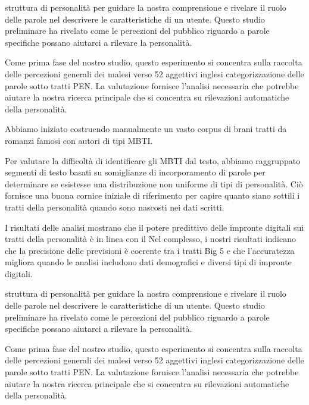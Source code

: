 struttura di personalità per guidare la nostra comprensione e rivelare il ruolo delle parole nel descrivere le caratteristiche di un utente. 
Questo studio preliminare ha rivelato come le percezioni del pubblico riguardo a parole specifiche possano aiutarci a rilevare la personalità. 

Come prima fase del nostro studio, questo esperimento si concentra sulla raccolta delle percezioni generali dei malesi verso 52 aggettivi inglesi categorizzazione delle parole sotto tratti PEN. 
La valutazione fornisce l'analisi necessaria che potrebbe aiutare la nostra ricerca principale che si concentra su rilevazioni automatiche della personalità. 










Abbiamo iniziato costruendo manualmente un vasto corpus di brani tratti da romanzi famosi con autori di tipi MBTI. 

Per valutare la difficoltà di identificare gli MBTI dal testo, abbiamo raggruppato segmenti di testo basati su somiglianze di incorporamento di parole per determinare se esistesse una distribuzione non uniforme di tipi di personalità. Ciò fornisce una buona cornice iniziale di riferimento per capire quanto siano sottili i tratti della personalità quando sono nascosti nei dati scritti. 



I risultati delle analisi mostrano che il potere predittivo delle impronte digitali sui tratti della personalità è in linea con il 
Nel complesso, i nostri risultati indicano che la precisione delle previsioni è coerente tra i tratti Big 5 e che l'accuratezza migliora quando le analisi includono dati demografici e diversi tipi di impronte digitali.


struttura di personalità per guidare la nostra comprensione e rivelare il ruolo delle parole nel descrivere le caratteristiche di un utente. 
Questo studio preliminare ha rivelato come le percezioni del pubblico riguardo a parole specifiche possano aiutarci a rilevare la personalità. 

Come prima fase del nostro studio, questo esperimento si concentra sulla raccolta delle percezioni generali dei malesi verso 52 aggettivi inglesi categorizzazione delle parole sotto tratti PEN. 
La valutazione fornisce l'analisi necessaria che potrebbe aiutare la nostra ricerca principale che si concentra su rilevazioni automatiche della personalità. 




